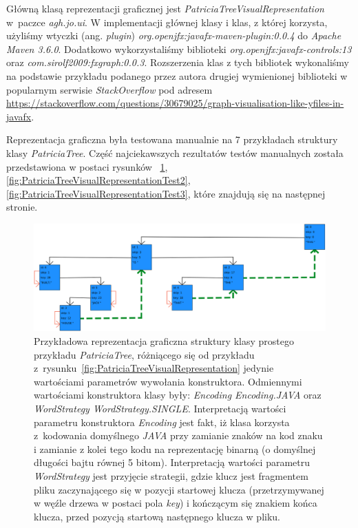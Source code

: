     	Główną klasą reprezentacji graficznej jest \emph{PatriciaTreeVisualRepresentation} w~paczce \emph{agh.jo.ui}. W implementacji głównej klasy i klas, z której korzysta, użyliśmy wtyczki (ang. \emph{plugin}) \emph{org.openjfx:javafx-maven-plugin:0.0.4} do \emph{Apache Maven 3.6.0}. Dodatkowo wykorzystaliśmy biblioteki \emph{org.openjfx:javafx-controls:13} oraz \emph{com.sirolf2009:fxgraph:0.0.3}. Rozszerzenia klas z tych bibliotek wykonaliśmy na podstawie przykładu podanego przez autora drugiej wymienionej biblioteki w popularnym serwisie \emph{StackOverflow} pod adresem \url{https://stackoverflow.com/questions/30679025/graph-visualisation-like-yfiles-in-javafx}.
		
		Reprezentacja graficzna była testowana manualnie na 7 przykładach struktury klasy \emph{PatriciaTree}. Część najciekawszych rezultatów testów manualnych została przedstawiona w postaci rysunków~ \ref{fig:PatriciaTreeVisualRepresentationTest1}, \ref{fig:PatriciaTreeVisualRepresentationTest2}, \ref{fig:PatriciaTreeVisualRepresentationTest3}, które znajdują się na następnej stronie.
		
        \begin{figure}[htb]
    		\caption{Przykładowa reprezentacja graficzna struktury klasy prostego przykładu \emph{PatriciaTree}, różniącego się od przykładu z~rysunku~\ref{fig:PatriciaTreeVisualRepresentation} jedynie wartościami parametrów wywołania konstruktora. Odmiennymi wartościami konstruktora klasy były: \emph{Encoding Encoding.JAVA} oraz \emph{WordStrategy WordStrategy.SINGLE}. Interpretacją wartości parametru konstruktora \emph{Encoding} jest fakt, iż klasa korzysta z~kodowania domyślnego \emph{JAVA} przy zamianie znaków na kod znaku i zamianie z kolei tego kodu na reprezentację binarną (o domyślnej długości bajtu równej 5 bitom). Interpretacją wartości parametru \emph{WordStrategy} jest przyjęcie strategii, gdzie klucz jest fragmentem pliku zaczynającego się w pozycji startowej klucza (przetrzymywanej w węźle drzewa w postaci pola \emph{key}) i kończącym się znakiem końca klucza, przed pozycją startową następnego klucza w pliku.}\label{fig:PatriciaTreeVisualRepresentationTest1}
    		\centering
    		\includegraphics[width = \textwidth]{representationSmall_compressed.png}
    	\end{figure}
		

